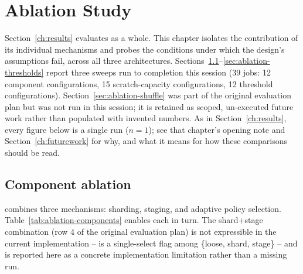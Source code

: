 \section{Ablation Study}
\label{ch:ablation}

Section~\ref{ch:results} evaluates \pads{} as a whole.
This chapter isolates the contribution of its individual mechanisms and probes the
conditions under which the design's assumptions fail, across all three
architectures. Sections~\ref{sec:ablation-components}--\ref{sec:ablation-thresholds}
report three sweeps run to completion this session (39 jobs: 12 component
configurations, 15 scratch-capacity configurations, 12 threshold configurations).
Section~\ref{sec:ablation-shuffle} was part of the original evaluation plan but
was not run in this session; it is retained as scoped, un-executed future work
rather than populated with invented numbers.
As in Section~\ref{ch:results}, every figure below is a single run ($n=1$);
see that chapter's opening note and Section~\ref{ch:futurework} for why, and
what it means for how these comparisons should be read.

\subsection{Component ablation}
\label{sec:ablation-components}

\pads{} combines three mechanisms: sharding, staging, and adaptive policy
selection. Table~\ref{tab:ablation-components} enables each in turn. The
shard+stage combination (row 4 of the original evaluation plan) is not
expressible in the current implementation --  is a
single-select flag among \{loose, shard, stage\} -- and is reported here as a
concrete implementation limitation rather than a missing run.

